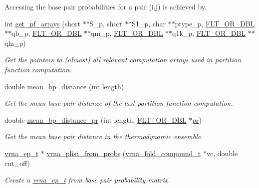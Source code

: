 \begin{DoxyCompactItemize}
\begin{DoxyCompactList}
Accessing the base pair probabilities for a pair (i,j) is achieved by. \end{DoxyCompactList}\item 
int \hyperlink{group__pf__fold_ga42faebdfce6f070c5f89adfc8427525c}{get\+\_\+pf\+\_\+arrays} (short $\ast$$\ast$S\+\_\+p, short $\ast$$\ast$S1\+\_\+p, char $\ast$$\ast$ptype\+\_\+p, \hyperlink{group__data__structures_ga31125aeace516926bf7f251f759b6126}{F\+L\+T\+\_\+\+O\+R\+\_\+\+D\+BL} $\ast$$\ast$qb\+\_\+p, \hyperlink{group__data__structures_ga31125aeace516926bf7f251f759b6126}{F\+L\+T\+\_\+\+O\+R\+\_\+\+D\+BL} $\ast$$\ast$qm\+\_\+p, \hyperlink{group__data__structures_ga31125aeace516926bf7f251f759b6126}{F\+L\+T\+\_\+\+O\+R\+\_\+\+D\+BL} $\ast$$\ast$q1k\+\_\+p, \hyperlink{group__data__structures_ga31125aeace516926bf7f251f759b6126}{F\+L\+T\+\_\+\+O\+R\+\_\+\+D\+BL} $\ast$$\ast$qln\+\_\+p)
\begin{DoxyCompactList}\small\item\em Get the pointers to (almost) all relavant computation arrays used in partition function computation. \end{DoxyCompactList}\item 
double \hyperlink{group__pf__fold_ga79cbc375af65f11609feb6b055269e7d}{mean\+\_\+bp\+\_\+distance} (int length)
\begin{DoxyCompactList}\small\item\em Get the mean base pair distance of the last partition function computation. \end{DoxyCompactList}\item 
double \hyperlink{group__pf__fold_gad5ba36cef8d01cf4244cc09b9bf1ce1d}{mean\+\_\+bp\+\_\+distance\+\_\+pr} (int length, \hyperlink{group__data__structures_ga31125aeace516926bf7f251f759b6126}{F\+L\+T\+\_\+\+O\+R\+\_\+\+D\+BL} $\ast$\hyperlink{fold__vars_8h_ac98ec419070aee6831b44e5c700f090f}{pr})
\begin{DoxyCompactList}\small\item\em Get the mean base pair distance in the thermodynamic ensemble. \end{DoxyCompactList}\item 
\hyperlink{group__struct__utils_gab9ac98ab55ded9fb90043b024b915aca}{vrna\+\_\+ep\+\_\+t} $\ast$ \hyperlink{group__pf__fold_ga94f6efc0b8d8712b023452794a0a5bd2}{vrna\+\_\+plist\+\_\+from\+\_\+probs} (\hyperlink{group__fold__compound_ga1b0cef17fd40466cef5968eaeeff6166}{vrna\+\_\+fold\+\_\+compound\+\_\+t} $\ast$vc, double cut\+\_\+off)
\begin{DoxyCompactList}\small\item\em Create a \hyperlink{group__struct__utils_gab9ac98ab55ded9fb90043b024b915aca}{vrna\+\_\+ep\+\_\+t} from base pair probability matrix. \end{DoxyCompactList}\item 
$$
\end{DoxyCompactItemize}

